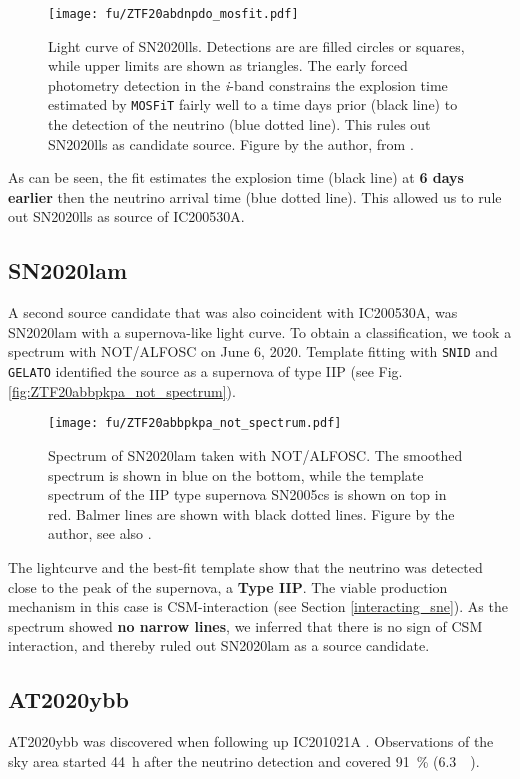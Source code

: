 \begin{figure}[h!]
    \texttt{[image: fu/ZTF20abdnpdo\_mosfit.pdf]}
    \caption[SN2020lls light curve fit]{Light curve of SN2020lls. Detections are are filled circles or squares, while upper limits are shown as triangles. The early forced photometry detection in the \textit{i}-band constrains the explosion time estimated by \texttt{MOSFiT} fairly well to a time days prior (black line) to the detection of the neutrino (blue dotted line). This rules out SN2020lls as candidate source. Figure by the author, from \cite{Stein2023a}.}
\end{figure}
As can be seen, the fit estimates the explosion time (black line) at \textbf{6 days earlier} then the neutrino arrival time (blue dotted line). This allowed us to rule out SN2020lls as source of IC200530A.

\subsection{SN2020lam} \label{SN2020lam}
A second source candidate that was also coincident with IC200530A, was SN2020lam  with a supernova-like light curve. To obtain a classification, we took a spectrum with NOT/ALFOSC on June 6, 2020. Template fitting with \texttt{SNID} and \texttt{GELATO}  identified the source as a supernova of type IIP (see Fig. \ref{fig:ZTF20abbpkpa_not_spectrum}).

\begin{figure}[h!]
    \texttt{[image: fu/ZTF20abbpkpa\_not\_spectrum.pdf]}
    \caption[SN2020lam spectrum]{Spectrum of SN2020lam taken with NOT/ALFOSC. The smoothed spectrum is shown in blue on the bottom, while the template spectrum of the IIP type supernova SN2005cs is shown on top in red. Balmer lines are shown with black dotted lines. Figure by the author, see also \cite{Stein2023a}.}
\end{figure}
The lightcurve and the best-fit template show that the neutrino was detected close to the peak of the supernova, a \textbf{Type IIP}. The viable production mechanism in this case is CSM-interaction (see Section \ref{interacting_sne}). As the spectrum showed \textbf{no narrow lines}, we inferred that there is no sign of CSM interaction, and thereby ruled out SN2020lam as a source candidate.

\subsection{AT2020ybb}
AT2020ybb was discovered when following up IC201021A . Observations of the sky area started \SI{44}{\hour} after the neutrino detection and covered \SI{91}{\percent} (\SI{6.3}{\square\deg}).

